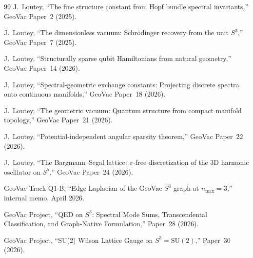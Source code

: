 \documentclass[aps,pra,twocolumn,superscriptaddress,longbibliography]{revtex4-2}
\begin{document}
\begin{thebibliography}{99}
J.~Loutey, ``The fine structure constant from Hopf bundle spectral
invariants,'' GeoVac Paper~2 (2025).

J.~Loutey, ``The dimensionless vacuum: Schr\"odinger recovery from the
unit $S^3$,'' GeoVac Paper~7 (2025).

J.~Loutey, ``Structurally sparse qubit Hamiltonians from natural
geometry,'' GeoVac Paper~14 (2026).

J.~Loutey, ``Spectral-geometric exchange constants: Projecting
discrete spectra onto continuous manifolds,'' GeoVac Paper~18 (2026).

J.~Loutey, ``The geometric vacuum: Quantum structure from compact
manifold topology,'' GeoVac Paper~21 (2026).

J.~Loutey, ``Potential-independent angular sparsity theorem,''
GeoVac Paper~22 (2026).

J.~Loutey, ``The Bargmann--Segal lattice: $\pi$-free discretization
of the 3D harmonic oscillator on $S^5$,'' GeoVac Paper~24 (2026).

GeoVac Track Q1-B, ``Edge Laplacian of the GeoVac $S^3$ graph at
$n_{\max} = 3$,'' internal memo, April 2026.

GeoVac Project, ``QED on $S^3$: Spectral Mode Sums, Transcendental
Classification, and Graph-Native Formulation,'' Paper~28 (2026).

GeoVac Project, ``SU(2) Wilson Lattice Gauge on $S^3 = \mathrm{SU}(2)$,''
Paper~30 (2026).

\end{thebibliography}
\end{document}
